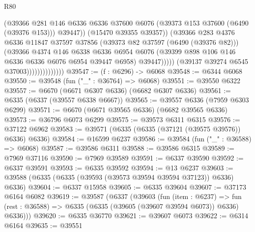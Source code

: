 \begin{lexlean}{R80}
\begin{coremodule}
                                        (@39366
                                          @281
                                          @146
                                          @6336
                                          @6336
                                          @37600
                                          @6076
                                          (@39373 @153 @37600 (@6490 (@39376 @153)))
                                          @39447))
                                      (@15470 @39355 @39357))
                                    (@39366
                                      @283
                                      @4376
                                      @6336
                                      @11847
                                      @37597
                                      @37856
                                      (@39373 @82 @37597 (@6490 (@39376 @82)))
                                      (@39366
                                        @4374
                                        @146
                                        @6338
                                        @6336
                                        @6954
                                        @6076
                                        (@39399 @898 @106 @146 @6336 @6336 @6076 @6954 @39447 @6958)
                                        @39447)))))
                              (@39137 @39274 @6545 @37003))))))))))))))
@39547 := (f : @6296) -> @6068
@39548 := @6344 @6068
@39550 := @39548 (fun ("_" : @36764) => @6068)
@39551 := @39550 @6322
@39557 := @6670 (@6671 @6307 @6336) (@6682 @6307 @6336)
@39561 := @6335 (@6337 (@39557 @6338 @6667))
@39565 := @39557 @6336 (@7959 @6303 @6299)
@39571 := @6670 (@6671 @39565 @6336) (@6682 @39565 @6336)
@39573 := @36796 @6073 @6299
@39575 := @39573 @6311 @6315
@39576 := @37122 @6962
@39583 := @39571 (@6335 (@6335 (@37121 (@39575 @39576)) @6336) @6336)
@39584 := @16599 @6237
@39586 := @39584 (fun ("_" : @36588) => @6068)
@39587 := @39586 @6311
@39588 := @39586 @6315
@39589 := @7969 @37116
@39590 := @7969 @39589
@39591 := @6337 @39590
@39592 := @6337 @39591
@39593 := @6335 @39592
@39594 := @13 @6237
@39603 := @39588 (@6335 (@6335 (@39593 (@39573 @39594 @39594 @37123)) @6336) @6336)
@39604 := @6337 @15958
@39605 := @6335 @39604
@39607 := @37173 @6164 @6082
@39619 := @39587
    (@6337
      (@39603
        (fun (item : @6237) =>
        fun (rest : @36588) => @6335 (@6335 (@39605 (@39607 @39594 @6073)) @6336) @6336)))
@39620 := @6335 @36770
@39621 := @39607 @6073
@39622 := @6314 @6164
@39635 := @39551

\end{coremodule}
\end{lexlean}
